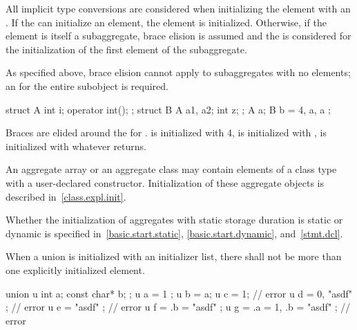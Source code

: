 \pnum
All implicit type conversions are considered when
initializing the element with an .
If the
can initialize an element, the element is initialized.
Otherwise, if the element is itself a subaggregate,
brace elision is assumed and the
is considered for the initialization of the first element of the subaggregate.
\begin{note} As specified above, brace elision cannot apply to
subaggregates with no elements; an
 for the entire subobject is
required.\end{note}

\begin{example}

\begin{codeblock}
struct A {
  int i;
  operator int();
};
struct B {
  A a1, a2;
  int z;
};
A a;
B b = { 4, a, a };
\end{codeblock}

Braces are elided around the
for
.
is initialized with 4,
is initialized with
,
is initialized with whatever
returns.
\end{example}

\pnum
{}%
\begin{note}
An aggregate array or an aggregate class may contain elements of a
class type with a user-declared constructor.
Initialization of these aggregate objects is described in~\ref{class.expl.init}.
\end{note}

\pnum
\begin{note}
Whether the initialization of aggregates with static storage duration
is static or dynamic is specified
in~\ref{basic.start.static}, \ref{basic.start.dynamic}, and~\ref{stmt.dcl}.
\end{note}

\pnum
{}%
When a union is initialized with an initializer list,
there shall not be more than one
explicitly initialized element.
\begin{example}
\begin{codeblock}
union u { int a; const char* b; };
u a = { 1 };
u b = a;
u c = 1;                        // error
u d = { 0, "asdf" };            // error
u e = { "asdf" };               // error
u f = { .b = "asdf" };
u g = { .a = 1, .b = "asdf" };  // error
\end{codeblock}
\end{example}

